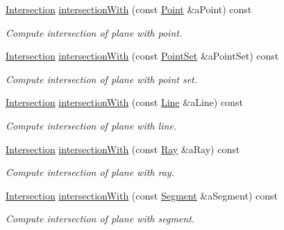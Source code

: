 \begin{DoxyCompactItemize}
\hyperlink{classostk_1_1math_1_1geom_1_1d3_1_1_intersection}{Intersection} \hyperlink{classostk_1_1math_1_1geom_1_1d3_1_1objects_1_1_plane_a1b0b693ea9fbe937dbaf39eda6fe86e6}{intersection\+With} (const \hyperlink{classostk_1_1math_1_1geom_1_1d3_1_1objects_1_1_point}{Point} \&a\+Point) const
\begin{DoxyCompactList}\small\item\em Compute intersection of plane with point. \end{DoxyCompactList}\item 
\hyperlink{classostk_1_1math_1_1geom_1_1d3_1_1_intersection}{Intersection} \hyperlink{classostk_1_1math_1_1geom_1_1d3_1_1objects_1_1_plane_a6fa36d3b2dda5f7a3e2774a4c35006b5}{intersection\+With} (const \hyperlink{classostk_1_1math_1_1geom_1_1d3_1_1objects_1_1_point_set}{Point\+Set} \&a\+Point\+Set) const
\begin{DoxyCompactList}\small\item\em Compute intersection of plane with point set. \end{DoxyCompactList}\item 
\hyperlink{classostk_1_1math_1_1geom_1_1d3_1_1_intersection}{Intersection} \hyperlink{classostk_1_1math_1_1geom_1_1d3_1_1objects_1_1_plane_aa85ba34c3f94fabf1e632f98fea48115}{intersection\+With} (const \hyperlink{classostk_1_1math_1_1geom_1_1d3_1_1objects_1_1_line}{Line} \&a\+Line) const
\begin{DoxyCompactList}\small\item\em Compute intersection of plane with line. \end{DoxyCompactList}\item 
\hyperlink{classostk_1_1math_1_1geom_1_1d3_1_1_intersection}{Intersection} \hyperlink{classostk_1_1math_1_1geom_1_1d3_1_1objects_1_1_plane_aa7a3428e047dee047890f82893abd8d7}{intersection\+With} (const \hyperlink{classostk_1_1math_1_1geom_1_1d3_1_1objects_1_1_ray}{Ray} \&a\+Ray) const
\begin{DoxyCompactList}\small\item\em Compute intersection of plane with ray. \end{DoxyCompactList}\item 
\hyperlink{classostk_1_1math_1_1geom_1_1d3_1_1_intersection}{Intersection} \hyperlink{classostk_1_1math_1_1geom_1_1d3_1_1objects_1_1_plane_a0c76a99ec76e6f1dc5fc5b39737b282e}{intersection\+With} (const \hyperlink{classostk_1_1math_1_1geom_1_1d3_1_1objects_1_1_segment}{Segment} \&a\+Segment) const
\begin{DoxyCompactList}\small\item\em Compute intersection of plane with segment. \end{DoxyCompactList}\item 

\end{DoxyCompactItemize}
